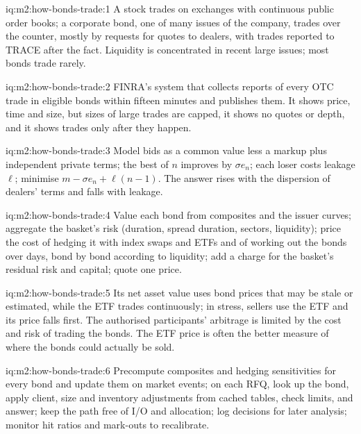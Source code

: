\begin{solution}{iq:m2:how-bonds-trade:1}
A stock trades on exchanges with continuous public order books; a corporate bond,
one of many issues of the company, trades over the counter, mostly by requests for
quotes to dealers, with trades reported to TRACE after the fact. Liquidity is
concentrated in recent large issues; most bonds trade rarely.
\end{solution}

\begin{solution}{iq:m2:how-bonds-trade:2}
FINRA's system that collects reports of every OTC trade in eligible bonds within
fifteen minutes and publishes them. It shows price, time and size, but sizes of large
trades are capped, it shows no quotes or depth, and it shows trades only after they
happen.
\end{solution}

\begin{solution}{iq:m2:how-bonds-trade:3}
Model bids as a common value less a markup plus independent private terms; the best
of $n$ improves by $\sigma e_n$; each loser costs leakage $\ell$; minimise
$m - \sigma e_n + \ell(n-1)$. The answer rises with the dispersion of dealers' terms
and falls with leakage.
\end{solution}

\begin{solution}{iq:m2:how-bonds-trade:4}
Value each bond from composites and the issuer curves; aggregate the basket's risk
(duration, spread duration, sectors, liquidity); price the cost of hedging it with
index swaps and ETFs and of working out the bonds over days, bond by bond according
to liquidity; add a charge for the basket's residual risk and capital; quote one
price.
\end{solution}

\begin{solution}{iq:m2:how-bonds-trade:5}
Its net asset value uses bond prices that may be stale or estimated, while the ETF
trades continuously; in stress, sellers use the ETF and its price falls first. The
authorised participants' arbitrage is limited by the cost and risk of trading the
bonds. The ETF price is often the better measure of where the bonds could actually be
sold.
\end{solution}

\begin{solution}{iq:m2:how-bonds-trade:6}
Precompute composites and hedging sensitivities for every bond and update them on
market events; on each RFQ, look up the bond, apply client, size and inventory
adjustments from cached tables, check limits, and answer; keep the path free of I/O
and allocation; log decisions for later analysis; monitor hit ratios and mark-outs to
recalibrate.
\end{solution}

